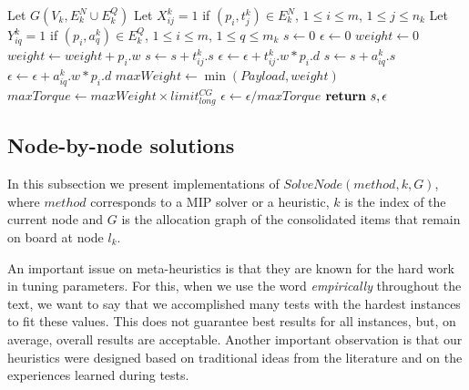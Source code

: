 \documentclass[preprint,authoryear]{elsarticle}
\begin{document}
\begin{algorithm}[H]
	\caption{$ScoreAndDeviation(k, G)$}  \label{alg:eval}
	
	\begin{algorithmic}[1]
		\State Let $G(V_k, E^N_k \cup E^Q_k)$
		\State Let $X_{ij}^k = 1$ if $(p_i, t_j^k) \in E^N_k$, $1 \leq i \leq m$, $1 \leq j \leq n_k$
		\State Let $Y_{iq}^k = 1$ if $(p_i, a_q^k) \in E^Q_k$, $1 \leq i \leq m$, $1 \leq q \leq m_k$
		\State $s \gets 0$
		\State $\epsilon \gets 0$
		\State $weight \gets 0$
			\label{eval:loop1}
			\State $weight \gets weight + p_i.w$		
					\State $s \gets s + t_{ij}^k.s$ \label{eval:score1}
					\State $\epsilon \gets \epsilon + t_{ij}^k.w * p_i.d$ \label{eval:eps1}
				\EndIf
			\EndFor				
					\State $s \gets s + a_{iq}^k.s$   \label{eval:score2}
					\State $\epsilon \gets \epsilon + a_{iq}^k.w * p_i.d$  \label{eval:eps2}
				\EndIf
			\EndFor	   \label{eval:loop2}
		\EndFor
		\State $maxWeight \gets \min(Payload, weight)$ \label{eval:torque1}
		\State $maxTorque \gets maxWeight \times limit^{CG}_{long}$
		\State $\epsilon \gets \epsilon/maxTorque$ \label{eval:torque2}
		\State ${\bf return}\ s, \epsilon$	
	\end{algorithmic}
\end{algorithm}


\subsection{Node-by-node solutions}
\label{methods}


In this subsection we present implementations of $SolveNode(method,k, G)$, where $method$\/ corresponds to a MIP solver or a heuristic, $k$\/ is the index of the current node and $G$\/ is the allocation graph of the consolidated items that remain on board at node $l_k$.

An important issue on meta-heuristics is that they are known for the hard work in tuning parameters. For this, when we use the word {\it empirically}\/ throughout the text, we want to say that we accomplished many tests with the hardest instances to fit these values. This does not guarantee best results for all instances, but, on average, overall results are acceptable. Another important observation is that our heuristics were designed based on traditional ideas from the literature \cite{NiarFreville1997,Fidanova2006,Laabadi2018,Alonso2019,Zhan2020} and on the experiences learned during tests.
\end{document}
